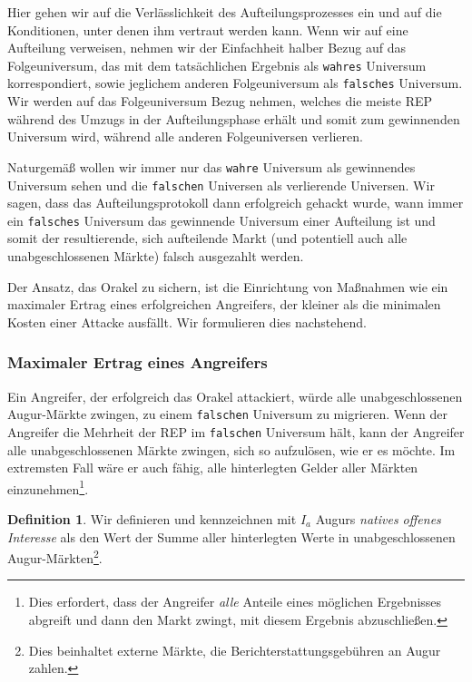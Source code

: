 \documentclass[floatfix,reprint,nofootinbib,amsmath,amssymb,epsfig,pre,floats,letterpaper,groupedaffiliation]{revtex4-1}
\theoremstyle{definition}
\theoremstyle{definition}
\newtheorem{definition}{Definition}
\theoremstyle{definition}
\begin{document}
Hier gehen wir auf die Verlässlichkeit des Aufteilungsprozesses ein und auf die Konditionen, unter denen ihm vertraut werden kann. Wenn wir auf eine Aufteilung verweisen, nehmen wir der Einfachheit halber Bezug auf das Folgeuniversum, das mit dem tatsächlichen Ergebnis als \texttt{wahres} Universum korrespondiert, sowie jeglichem anderen Folgeuniversum als \texttt{falsches} Universum. Wir werden auf das Folgeuniversum Bezug nehmen, welches die meiste REP während des Umzugs in der Aufteilungsphase erhält und somit zum gewinnenden Universum wird, während alle anderen Folgeuniversen verlieren.

Naturgemäß wollen wir immer nur das \texttt{wahre} Universum als gewinnendes Universum sehen und die \texttt{falschen} Universen als verlierende Universen. Wir sagen, dass das Aufteilungsprotokoll dann erfolgreich gehackt wurde, wann immer ein \texttt{falsches} Universum das gewinnende Universum einer Aufteilung ist und somit der resultierende, sich aufteilende Markt (und potentiell auch alle unabgeschlossenen Märkte) falsch ausgezahlt werden.

Der Ansatz, das Orakel zu sichern, ist die Einrichtung von Maßnahmen wie ein maximaler Ertrag eines erfolgreichen Angreifers, der kleiner als die minimalen Kosten einer Attacke ausfällt. Wir formulieren dies nachstehend.

\subsubsection{Maximaler Ertrag eines Angreifers}

Ein Angreifer, der erfolgreich das Orakel attackiert, würde alle unabgeschlossenen Augur-Märkte zwingen, zu einem \texttt{falschen} Universum zu migrieren. Wenn der Angreifer die Mehrheit der REP im \texttt{falschen} Universum hält, kann der Angreifer alle unabgeschlossenen Märkte zwingen, sich so aufzulösen, wie er es möchte. Im extremsten Fall wäre er auch fähig, alle hinterlegten Gelder aller Märkten einzunehmen\footnote{Dies erfordert, dass der Angreifer \textit{alle} Anteile eines möglichen Ergebnisses abgreift und dann den Markt zwingt, mit diesem Ergebnis abzuschließen.}.

\begin{definition}
Wir definieren und kennzeichnen mit $I_a$ Augurs \textit{natives offenes Interesse} als den Wert der Summe aller hinterlegten Werte in unabgeschlossenen Augur-Märkten\footnote{Dies beinhaltet externe Märkte, die Berichterstattungsgebühren an Augur zahlen.}.
\end{definition}
\end{document}
